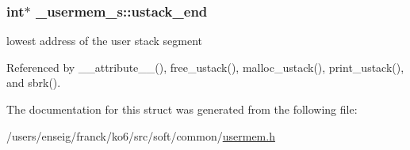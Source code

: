 \hypertarget{struct__usermem__s_a2ff86fc41cdbe6063962b5be6aef49fc}{
\subsubsection[{ustack\-\_\-end}]{\setlength{\rightskip}{0pt plus 5cm}int$\ast$ \-\_\-usermem\-\_\-s\-::ustack\-\_\-end}}\label{struct__usermem__s_a2ff86fc41cdbe6063962b5be6aef49fc}


lowest address of the user stack segment 



Referenced by \-\_\-\-\_\-attribute\-\_\-\-\_\-(), free\-\_\-ustack(), malloc\-\_\-ustack(), print\-\_\-ustack(), and sbrk().



The documentation for this struct was generated from the following file\-:\begin{DoxyCompactItemize}
\item 
/users/enseig/franck/ko6/src/soft/common/\hyperlink{usermem_8h}{usermem.\-h}\end{DoxyCompactItemize}
